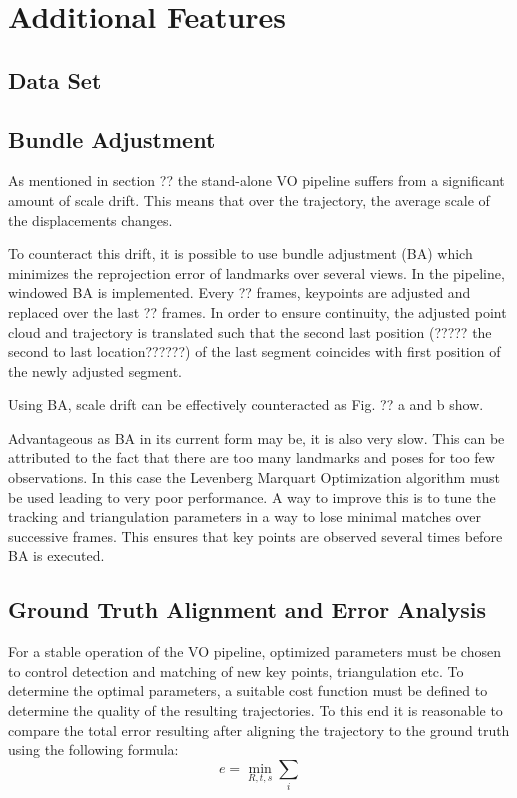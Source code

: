 \chapter{Additional Features}
\section{Data Set}
\label{dataset}

\section{Bundle Adjustment}
\label{bundle adjustment}
As mentioned in section ?? the stand-alone VO pipeline suffers from a significant amount of scale drift. This means that over the trajectory, the average scale of the displacements changes. \par
To counteract this drift, it is possible to use bundle adjustment (BA) which minimizes the reprojection error of landmarks over several views. In the pipeline, windowed BA is implemented. Every ?? frames, keypoints are adjusted and replaced over the last ?? frames. In order to ensure continuity, the adjusted point cloud and trajectory is translated such that the second last position (????? the second to last location??????) of the last segment coincides with first position of the newly adjusted segment. \par
Using BA, scale drift can be effectively counteracted as Fig. ?? a and b show. \par
Advantageous as BA in its current form may be, it is also very slow. This can be attributed to the fact that there are too many landmarks and poses for too few observations. In this case the Levenberg Marquart Optimization algorithm must be used leading to very poor performance. A way to improve this is to tune the tracking and triangulation parameters in a way to lose minimal matches over successive frames. This ensures that key points are observed several times before BA is executed. 

\section{Ground Truth Alignment and Error Analysis}
\label{simulation}
For a stable operation of the VO pipeline, optimized parameters must be chosen to control detection and matching of new key points, triangulation etc. To determine the optimal parameters, a suitable cost function must be defined to determine the quality of the resulting trajectories. To this end it is reasonable to compare the total error resulting after aligning the trajectory to the ground truth using the following formula:
$$e = \underset{R,t,s}{\min} \sum_i$$
